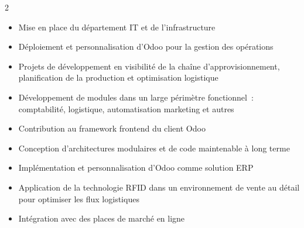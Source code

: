 \documentclass[10pt,a4paper,ragged2e,withhyper]{altacv}
\begin{document}


\makecvheader


\begin{paracol}{2}


\begin{itemize}
\item Mise en place du département IT et de l'infrastructure
\item Déploiement et personnalisation d'Odoo pour la gestion des opérations
\item Projets de développement en visibilité de la chaîne d'approvisionnement, planification de la production et optimisation logistique
\end{itemize}

\divider

\begin{itemize}
\item Développement de modules dans un large périmètre fonctionnel~: comptabilité, logistique, automatisation marketing et autres
\item Contribution au framework frontend du client Odoo
\item Conception d'architectures modulaires et de code maintenable à long terme
\end{itemize}

\divider

\begin{itemize}
\item Implémentation et personnalisation d'Odoo comme solution ERP
\item Application de la technologie RFID dans un environnement de vente au détail pour optimiser les flux logistiques
\item Intégration avec des places de marché en ligne
\end{itemize}


\end{paracol}
\end{document}
